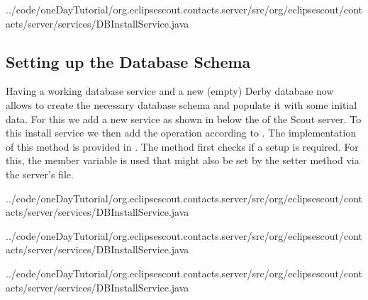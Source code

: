 \documentclass[a4paper,10pt,twoside]{book}
\begin{document}

{../code/oneDayTutorial/org.eclipsescout.contacts.server/src/org/eclipsescout/contacts/server/services/DBInstallService.java}

\subsection{Setting up the Database Schema}

Having a working database service and a new (empty) Derby database now allows to create the necessary database schema and populate it with some initial data.
For this we add a new  service as shown in  below the  of the Scout server.
To this install service we then add the  operation according to .
The implementation of this method is provided in .
The method first checks if a setup is required. 
For this, the member variable  is used that might also be set by the  setter method via the server's  file.


{../code/oneDayTutorial/org.eclipsescout.contacts.server/src/org/eclipsescout/contacts/server/services/DBInstallService.java}


{../code/oneDayTutorial/org.eclipsescout.contacts.server/src/org/eclipsescout/contacts/server/services/DBInstallService.java}


{../code/oneDayTutorial/org.eclipsescout.contacts.server/src/org/eclipsescout/contacts/server/services/DBInstallService.java}
\end{document}
